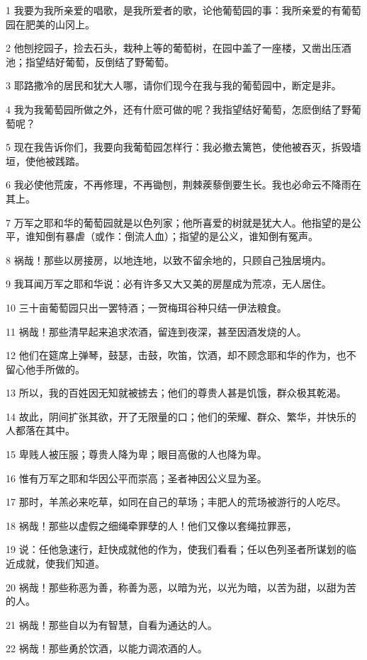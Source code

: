 \par 1 我要为我所亲爱的唱歌，是我所爱者的歌，论他葡萄园的事：我所亲爱的有葡萄园在肥美的山冈上。
\par 2 他刨挖园子，捡去石头，栽种上等的葡萄树，在园中盖了一座楼，又凿出压酒池；指望结好葡萄，反倒结了野葡萄。
\par 3 耶路撒冷的居民和犹大人哪，请你们现今在我与我的葡萄园中，断定是非。
\par 4 我为我葡萄园所做之外，还有什麽可做的呢？我指望结好葡萄，怎麽倒结了野葡萄呢？
\par 5 现在我告诉你们，我要向我葡萄园怎样行：我必撤去篱笆，使他被吞灭，拆毁墙垣，使他被践踏。
\par 6 我必使他荒废，不再修理，不再锄刨，荆棘蒺藜倒要生长。我也必命云不降雨在其上。
\par 7 万军之耶和华的葡萄园就是以色列家；他所喜爱的树就是犹大人。他指望的是公平，谁知倒有暴虐（或作：倒流人血）；指望的是公义，谁知倒有冤声。
\par 8 祸哉！那些以房接房，以地连地，以致不留余地的，只顾自己独居境内。
\par 9 我耳闻万军之耶和华说：必有许多又大又美的房屋成为荒凉，无人居住。
\par 10 三十亩葡萄园只出一罢特酒；一贺梅珥谷种只结一伊法粮食。
\par 11 祸哉！那些清早起来追求浓酒，留连到夜深，甚至因酒发烧的人。
\par 12 他们在筵席上弹琴，鼓瑟，击鼓，吹笛，饮酒，却不顾念耶和华的作为，也不留心他手所做的。
\par 13 所以，我的百姓因无知就被掳去；他们的尊贵人甚是饥饿，群众极其乾渴。
\par 14 故此，阴间扩张其欲，开了无限量的口；他们的荣耀、群众、繁华，并快乐的人都落在其中。
\par 15 卑贱人被压服；尊贵人降为卑；眼目高傲的人也降为卑。
\par 16 惟有万军之耶和华因公平而崇高；圣者神因公义显为圣。
\par 17 那时，羊羔必来吃草，如同在自己的草场；丰肥人的荒场被游行的人吃尽。
\par 18 祸哉！那些以虚假之细绳牵罪孽的人！他们又像以套绳拉罪恶，
\par 19 说：任他急速行，赶快成就他的作为，使我们看看；任以色列圣者所谋划的临近成就，使我们知道。
\par 20 祸哉！那些称恶为善，称善为恶，以暗为光，以光为暗，以苦为甜，以甜为苦的人。
\par 21 祸哉！那些自以为有智慧，自看为通达的人。
\par 22 祸哉！那些勇於饮酒，以能力调浓酒的人。
